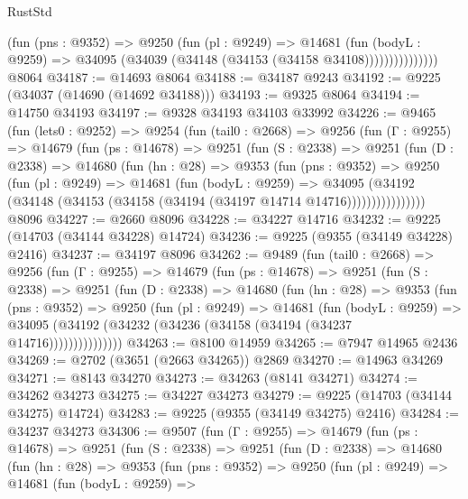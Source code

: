 \begin{lexlean}{RustStd}
\begin{coremodule}
                    (fun (pns : @9352) =>
                    @9250
                      (fun (pl : @9249) =>
                      @14681
                        (fun (bodyL : @9259) =>
                        @34095 (@34039 (@34148 (@34153 (@34158 @34108)))))))))))))))
    @8064
@34187 := @14693 @8064
@34188 := @34187 @9243
@34192 := @9225 (@34037 (@14690 (@14692 @34188)))
@34193 := @9325 @8064
@34194 := @14750 @34193
@34197 := @9328 @34193 @34103 @33992
@34226 := @9465
    (fun (lets0 : @9252) =>
    @9254
      (fun (tail0 : @2668) =>
      @9256
        (fun (Γ : @9255) =>
        @14679
          (fun (ps : @14678) =>
          @9251
            (fun (S : @2338) =>
            @9251
              (fun (D : @2338) =>
              @14680
                (fun (hn : @28) =>
                @9353
                  (fun (pns : @9352) =>
                  @9250
                    (fun (pl : @9249) =>
                    @14681
                      (fun (bodyL : @9259) =>
                      @34095
                        (@34192
                          (@34148 (@34153 (@34158 (@34194 (@34197 @14714 @14716))))))))))))))))
    @8096
@34227 := @2660 @8096
@34228 := @34227 @14716
@34232 := @9225 (@14703 (@34144 @34228) @14724)
@34236 := @9225 (@9355 (@34149 @34228) @2416)
@34237 := @34197 @8096
@34262 := @9489
    (fun (tail0 : @2668) =>
    @9256
      (fun (Γ : @9255) =>
      @14679
        (fun (ps : @14678) =>
        @9251
          (fun (S : @2338) =>
          @9251
            (fun (D : @2338) =>
            @14680
              (fun (hn : @28) =>
              @9353
                (fun (pns : @9352) =>
                @9250
                  (fun (pl : @9249) =>
                  @14681
                    (fun (bodyL : @9259) =>
                    @34095 (@34192 (@34232 (@34236 (@34158 (@34194 (@34237 @14716)))))))))))))))
@34263 := @8100 @14959
@34265 := @7947 @14965 @2436
@34269 := @2702 (@3651 (@2663 @34265)) @2869
@34270 := @14963 @34269
@34271 := @8143 @34270
@34273 := @34263 (@8141 @34271)
@34274 := @34262 @34273
@34275 := @34227 @34273
@34279 := @9225 (@14703 (@34144 @34275) @14724)
@34283 := @9225 (@9355 (@34149 @34275) @2416)
@34284 := @34237 @34273
@34306 := @9507
    (fun (Γ : @9255) =>
    @14679
      (fun (ps : @14678) =>
      @9251
        (fun (S : @2338) =>
        @9251
          (fun (D : @2338) =>
          @14680
            (fun (hn : @28) =>
            @9353
              (fun (pns : @9352) =>
              @9250
                (fun (pl : @9249) =>
                @14681
                  (fun (bodyL : @9259) =>

\end{coremodule}
\end{lexlean}
